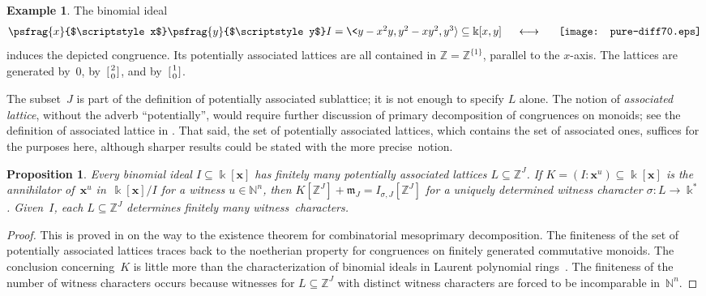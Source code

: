 \documentclass[12pt]{amsart}
\numberwithin{equation}{section}
\newtheorem{prop}[thm]{Proposition}
\theoremstyle{definition}
\newtheorem{example}[thm]{Example}
\begin{document}
\begin{example}
The binomial ideal
$$\psfrag{x}{$\scriptstyle x$}
\psfrag{y}{$\scriptstyle y$}
\begin{array}{@{}cc@{}}
  \begin{array}{@{}c@{}}
  I = \<y-x^2y,y^2-xy^2,y^3{\rangle} \subseteq {\Bbbk}[x,y]
  \quad\ \longleftrightarrow\
  \end{array}
&
  \begin{array}{c@{}}\texttt{[image: pure-diff70.eps]}\end{array}
\end{array}
$$
induces the depicted congruence.  Its potentially associated lattices
are all contained in ${\mathbb{Z}} = {\mathbb{Z}}^{\{1\}}$, parallel to the $x$-axis.
The lattices are generated by~$0$, by~$[{{{\genfrac{}{}{0pt}{1}{{\scriptstyle {2}}}{{\scriptstyle {0}}}}}}]$, and
by~$[{{{\genfrac{}{}{0pt}{1}{{\scriptstyle {1}}}{{\scriptstyle {0}}}}}}]$.
\end{example}

The subset~$J$ is part of the definition of potentially associated
sublattice; it is not enough to specify $L$ alone.  The notion of
\emph{associated lattice}, without the adverb ``potentially'', would
require further discussion of primary decomposition of congruences on
monoids; see
the definition of associated lattice in \cite{mesoprimary}.  That
said, the set of potentially associated lattices, which contains the
set of associated ones, suffices for the purposes here, although
sharper results could be stated with the more precise~notion.

\begin{prop}\label{p:witness}
Every binomial ideal $I \subseteq {\Bbbk}[{\mathbf{x}}]$ has finitely many
potentially associated lattices $L \subseteq {\mathbb{Z}}^J$.  If $K =
(I:{\mathbf{x}}^u) \subseteq {\Bbbk}[{\mathbf{x}}]$ is the annihilator of\/~${\mathbf{x}}^u$
in~${\Bbbk}[{\mathbf{x}}]/I$ for a witness $u \in {\mathbb{N}}^n$, then $K[{\mathbb{Z}}^J] + {\mathfrak{m}}_J =
I_{\sigma,J}[{\mathbb{Z}}^J]$ for a uniquely determined \emph{witness
character} $\sigma: L \to {\Bbbk}^*$.  Given~$I$, each $L \subseteq {\mathbb{Z}}^J$
determines finitely many witness~\mbox{characters}.
\end{prop}
\begin{proof}
This is
proved in \cite{mesoprimary} on the way to the
existence theorem for combinatorial mesoprimary decomposition.  The
finiteness of the set of potentially associated lattices traces back
to the noetherian property for congruences on finitely generated
commutative monoids.  The conclusion concerning~$K$ is little more
than the characterization of binomial ideals in Laurent polynomial
rings~\cite[Theorem~2.1]{binomialIdeals}.  The finiteness of the
number of witness characters occurs because witnesses for $L \subseteq
{\mathbb{Z}}^J$ with distinct witness characters are forced to be incomparable
in~${\mathbb{N}}^n$.
\end{proof}
\end{document}
